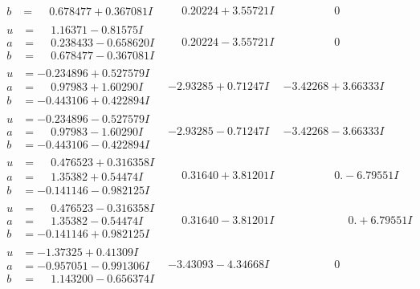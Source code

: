 \documentclass[1p]{elsarticle_modified}
\theoremstyle{definition}
\begin{document}
$$\begin{array}{c|c|c}
\begin{aligned}
b &= \phantom{-}0.678477 + 0.367081 I\end{aligned}
 & \phantom{-}0.20224 + 3.55721 I & \phantom{-0.000000 } 0 \\ \hline\begin{aligned}
u &= \phantom{-}1.16371 - 0.81575 I \\
a &= \phantom{-}0.238433 - 0.658620 I \\
b &= \phantom{-}0.678477 - 0.367081 I\end{aligned}
 & \phantom{-}0.20224 - 3.55721 I & \phantom{-0.000000 } 0 \\ \hline\begin{aligned}
u &= -0.234896 + 0.527579 I \\
a &= \phantom{-}0.97983 + 1.60290 I \\
b &= -0.443106 + 0.422894 I\end{aligned}
 & -2.93285 + 0.71247 I & -3.42268 + 3.66333 I \\ \hline\begin{aligned}
u &= -0.234896 - 0.527579 I \\
a &= \phantom{-}0.97983 - 1.60290 I \\
b &= -0.443106 - 0.422894 I\end{aligned}
 & -2.93285 - 0.71247 I & -3.42268 - 3.66333 I \\ \hline\begin{aligned}
u &= \phantom{-}0.476523 + 0.316358 I \\
a &= \phantom{-}1.35382 + 0.54474 I \\
b &= -0.141146 - 0.982125 I\end{aligned}
 & \phantom{-}0.31640 + 3.81201 I & \phantom{-0.000000 } 0. - 6.79551 I \\ \hline\begin{aligned}
u &= \phantom{-}0.476523 - 0.316358 I \\
a &= \phantom{-}1.35382 - 0.54474 I \\
b &= -0.141146 + 0.982125 I\end{aligned}
 & \phantom{-}0.31640 - 3.81201 I & \phantom{-0.000000 -}0. + 6.79551 I \\ \hline\begin{aligned}
u &= -1.37325 + 0.41309 I \\
a &= -0.957051 - 0.991306 I \\
b &= \phantom{-}1.143200 - 0.656374 I\end{aligned}
 & -3.43093 - 4.34668 I & \phantom{-0.000000 } 0 \\ \hline\begin{aligned}

\end{aligned}
\end{array}$$
\end{document}
